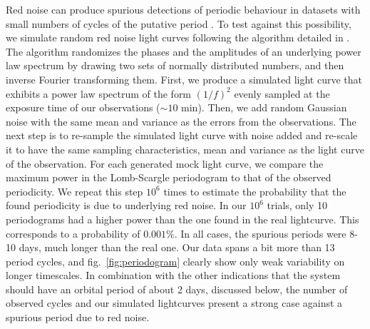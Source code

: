 \documentclass[fleqn,usenatbib,useAMS,letters]{mnras}
\begin{document}
Red noise %
can produce spurious detections of periodic behaviour in datasets with small numbers of cycles of the putative period \citep{Press1978RedNoise}.%
 To test against this possibility, we simulate random red noise light curves following the algorithm detailed in \citet{Timmer1995Rednoise}. The algorithm randomizes the phases and the amplitudes of an underlying power law spectrum by drawing two sets of normally distributed numbers, and then inverse Fourier transforming them. First, we produce a simulated light curve that exhibits a power law spectrum of the form $(1/f)^2$ evenly sampled at the exposure time of our observations ($\sim 10$ min). Then, we add random Gaussian noise with the same mean and variance as the errors from the observations. The next step is to re-sample the  simulated light curve with noise added and  re-scale it to have the same sampling characteristics, mean and variance as the light curve of the observation. For each generated mock light curve, we compare the maximum power in the Lomb-Scargle periodogram to that of the observed periodicity. We repeat this step $10^6$ times to estimate the probability that the found periodicity is due to underlying red noise. In our $10^6$ trials, only 10 periodograms had a higher power than the one found in the real lightcurve. This corresponds to a probability of $0.001\%$.  In all cases, the spurious periods were 8-10 days, much longer than the real one. Our data spans a bit more than 13 period cycles, and fig.~\ref{fig:periodogram} clearly show only weak variability on longer timescales.  In combination with the other indications that the system should have an orbital period of about 2 days, discussed below, the number of observed cycles and our simulated lightcurves present a strong case against a spurious period due to red noise.


\end{document}
